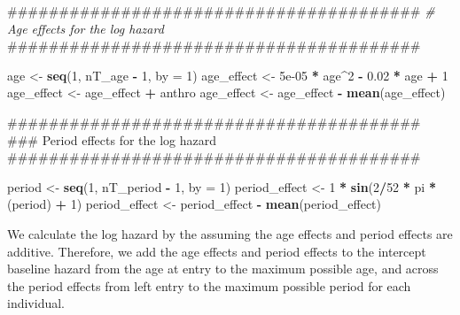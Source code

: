 \documentclass[11pt,]{article}
\newenvironment{Shaded}{\begin{snugshade}}{\end{snugshade}}
\newcommand{\KeywordTok}[1]{\textcolor[rgb]{0.13,0.29,0.53}{\textbf{#1}}}
\newcommand{\DataTypeTok}[1]{\textcolor[rgb]{0.13,0.29,0.53}{#1}}
\newcommand{\DecValTok}[1]{\textcolor[rgb]{0.00,0.00,0.81}{#1}}
\newcommand{\FloatTok}[1]{\textcolor[rgb]{0.00,0.00,0.81}{#1}}
\newcommand{\StringTok}[1]{\textcolor[rgb]{0.31,0.60,0.02}{#1}}
\newcommand{\CommentTok}[1]{\textcolor[rgb]{0.56,0.35,0.01}{\textit{#1}}}
\newcommand{\OperatorTok}[1]{\textcolor[rgb]{0.81,0.36,0.00}{\textbf{#1}}}
\newcommand{\NormalTok}[1]{#1}
\begin{document}
\begin{Shaded}
\begin{Highlighting}[]
\NormalTok{  ########################################}
  \CommentTok{# Age effects for the log hazard}
\NormalTok{  ########################################}

\NormalTok{  age <-}\StringTok{ }\KeywordTok{seq}\NormalTok{(}\DecValTok{1}\NormalTok{, nT_age }\OperatorTok{-}\StringTok{ }\DecValTok{1}\NormalTok{, }\DataTypeTok{by =} \DecValTok{1}\NormalTok{)}
\NormalTok{  age_effect <-}\StringTok{ }\FloatTok{5e-05} \OperatorTok{*}\StringTok{ }\NormalTok{age}\OperatorTok{^}\DecValTok{2} \OperatorTok{-}\StringTok{ }\FloatTok{0.02} \OperatorTok{*}\StringTok{ }\NormalTok{age }\OperatorTok{+}\StringTok{ }\DecValTok{1}
\NormalTok{  age_effect <-}\StringTok{ }\NormalTok{age_effect }\OperatorTok{+}\StringTok{ }\NormalTok{anthro}
\NormalTok{  age_effect <-}\StringTok{ }\NormalTok{age_effect }\OperatorTok{-}\StringTok{ }\KeywordTok{mean}\NormalTok{(age_effect)}
 
\NormalTok{  ########################################}
\NormalTok{  ### Period effects for the log hazard }
\NormalTok{  ########################################}

\NormalTok{  period <-}\StringTok{ }\KeywordTok{seq}\NormalTok{(}\DecValTok{1}\NormalTok{, nT_period }\OperatorTok{-}\StringTok{ }\DecValTok{1}\NormalTok{, }\DataTypeTok{by =} \DecValTok{1}\NormalTok{)}
\NormalTok{  period_effect <-}\StringTok{ }\DecValTok{1} \OperatorTok{*}\StringTok{ }\KeywordTok{sin}\NormalTok{(}\DecValTok{2}\OperatorTok{/}\DecValTok{52} \OperatorTok{*}\StringTok{ }\NormalTok{pi }\OperatorTok{*}\StringTok{ }\NormalTok{(period) }\OperatorTok{+}\StringTok{ }\DecValTok{1}\NormalTok{)}
\NormalTok{  period_effect <-}\StringTok{ }\NormalTok{period_effect }\OperatorTok{-}\StringTok{ }\KeywordTok{mean}\NormalTok{(period_effect)}
\end{Highlighting}
\end{Shaded}

We calculate the log hazard by the assuming the age effects and period
effects are additive. Therefore, we add the age effects and period
effects to the intercept baseline hazard from the age at entry to the
maximum possible age, and across the period effects from left entry to
the maximum possible period for each individual.
\end{document}
